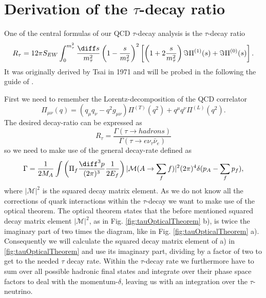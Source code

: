 
\section{Derivation of the $\tau$-decay ratio}
One of the central formulas of our QCD $\tau$-decay analysis is the $\tau$-decay ratio
\begin{equation}
	R_\tau = 12 \pi S_{EW} \int_0^{m_\tau^2} \frac{\diff s}{m_\tau^2} \left(1 - \frac{s}{m_\tau^2} \right)^2 \left[ \left( 1 + 2 \frac{s}{m_\tau^2} \right) \Im \Pi^{(1)} (s) + \Im \Pi^{(0)} (s) \right].
\end{equation}
It was originally derived by Tsai in 1971 \cite{Tsai1971} and will be probed in the following the guide of \cite{Schwab2002}.

First we need to remember the Lorentz-decomposition of the QCD correlator
\begin{equation}
	\label{eq:appTauLorentzDecomposition}
	\Pi_{\mu\nu} (q) = (q_\mu q_\nu - q^2 g_{\mu\nu}) \Pi^{(T)}(q^2) + q^\mu q^\nu \Pi^{(L)} (q^2).
\end{equation}
The desired decay-ratio can be expressed as
\begin{equation}
	R_\tau = \frac{\Gamma(\tau \to hadrons)}{\Gamma(\tau\to e \nu_\tau \bar \nu_e)}
\end{equation}
so we need to make use of the general decay-rate defined as
\begin{equation}
	\Gamma = \frac{1}{2 M_A} \int \left( \Pi_f \frac{\diff^3 p}{(2\pi)^3} \frac{1}{2 E_f} \right) | \mathcal{M} (A \to \sum_f f) |^2 (2\pi)^4 \delta(p_A - \sum_f p_f),
\end{equation}
where $|\mathcal{M}|^2$ is the squared decay matrix element.
As we do not know all the corrections of quark interactions within the $\tau$-decay we want to make use of the optical theorem. The optical theorem states that the before mentioned squared decay matrix element $|\mathcal{M}|^2$, as in Fig. \ref{fig:tauOpticalTheorem} b), is twice the imaginary part of two times the diagram, like in Fig. \ref{fig:tauOpticalTheorem} a). Consequently we will calculate the squared decay matrix element of a) in \ref{fig:tauOpticalTheorem} and use its imaginary part, dividing by a factor of two to get to the needed $\tau$ decay rate. Within the $\tau$-decay rate we furthermore have to sum over all possible hadronic final states and integrate over their phase space factors to deal with the momentum-$\delta$, leaving us with an integration over the $\tau$-neutrino.
